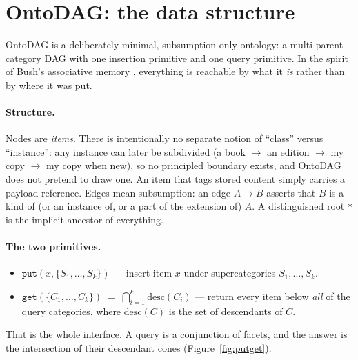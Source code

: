 \documentclass[10pt,twocolumn]{article}
\begin{document}
\section{OntoDAG: the data structure}
\label{sec:ontodag}

OntoDAG \cite{ontodag} is a deliberately minimal, subsumption-only
ontology: a multi-parent category DAG with one insertion primitive and one
query primitive. In the spirit of Bush's associative memory
\cite{bush1945}, everything is reachable by what it \emph{is} rather than
by where it was put.

\paragraph{Structure.}
Nodes are \emph{items}. There is intentionally no separate notion of
``class'' versus ``instance'': any instance can later be subdivided (a
book $\to$ an edition $\to$ my copy $\to$ my copy when new), so no
principled boundary exists, and OntoDAG does not pretend to draw one. An
item that tags stored content simply carries a payload reference. Edges
mean subsumption: an edge $A \to B$ asserts that $B$ is a kind of (or an
instance of, or a part of the extension of) $A$. A distinguished root
\texttt{*} is the implicit ancestor of everything.

\paragraph{The two primitives.}
\begin{itemize}
  \item $\texttt{put}(x, \{S_1,\dots,S_k\})$ --- insert item $x$ under
  supercategories $S_1,\dots,S_k$.
  \item $\texttt{get}(\{C_1,\dots,C_k\}) \;=\; \bigcap_{i=1}^{k}
  \mathrm{desc}(C_i)$ --- return every item below \emph{all} of the query
  categories, where $\mathrm{desc}(C)$ is the set of descendants of $C$.
\end{itemize}
That is the whole interface. A query is a conjunction of facets, and the
answer is the intersection of their descendant cones
(Figure~\ref{fig:putget}).
\end{document}
